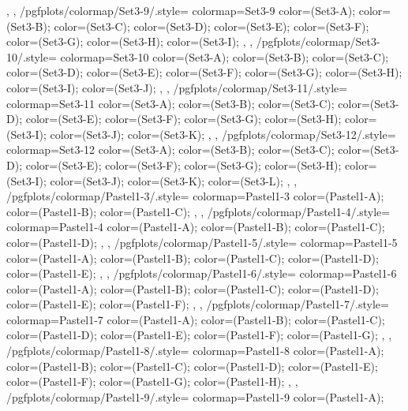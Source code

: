 {{{    },
  },
  /pgfplots/colormap/Set3-9/.style={
    colormap={Set3-9}{
      color=(Set3-A);
      color=(Set3-B);
      color=(Set3-C);
      color=(Set3-D);
      color=(Set3-E);
      color=(Set3-F);
      color=(Set3-G);
      color=(Set3-H);
      color=(Set3-I);
    },
  },
  /pgfplots/colormap/Set3-10/.style={
    colormap={Set3-10}{
      color=(Set3-A);
      color=(Set3-B);
      color=(Set3-C);
      color=(Set3-D);
      color=(Set3-E);
      color=(Set3-F);
      color=(Set3-G);
      color=(Set3-H);
      color=(Set3-I);
      color=(Set3-J);
    },
  },
  /pgfplots/colormap/Set3-11/.style={
    colormap={Set3-11}{
      color=(Set3-A);
      color=(Set3-B);
      color=(Set3-C);
      color=(Set3-D);
      color=(Set3-E);
      color=(Set3-F);
      color=(Set3-G);
      color=(Set3-H);
      color=(Set3-I);
      color=(Set3-J);
      color=(Set3-K);
    },
  },
  /pgfplots/colormap/Set3-12/.style={
    colormap={Set3-12}{
      color=(Set3-A);
      color=(Set3-B);
      color=(Set3-C);
      color=(Set3-D);
      color=(Set3-E);
      color=(Set3-F);
      color=(Set3-G);
      color=(Set3-H);
      color=(Set3-I);
      color=(Set3-J);
      color=(Set3-K);
      color=(Set3-L);
    },
  },
  /pgfplots/colormap/Pastel1-3/.style={
    colormap={Pastel1-3}{
      color=(Pastel1-A);
      color=(Pastel1-B);
      color=(Pastel1-C);
    },
  },
  /pgfplots/colormap/Pastel1-4/.style={
    colormap={Pastel1-4}{
      color=(Pastel1-A);
      color=(Pastel1-B);
      color=(Pastel1-C);
      color=(Pastel1-D);
    },
  },
  /pgfplots/colormap/Pastel1-5/.style={
    colormap={Pastel1-5}{
      color=(Pastel1-A);
      color=(Pastel1-B);
      color=(Pastel1-C);
      color=(Pastel1-D);
      color=(Pastel1-E);
    },
  },
  /pgfplots/colormap/Pastel1-6/.style={
    colormap={Pastel1-6}{
      color=(Pastel1-A);
      color=(Pastel1-B);
      color=(Pastel1-C);
      color=(Pastel1-D);
      color=(Pastel1-E);
      color=(Pastel1-F);
    },
  },
  /pgfplots/colormap/Pastel1-7/.style={
    colormap={Pastel1-7}{
      color=(Pastel1-A);
      color=(Pastel1-B);
      color=(Pastel1-C);
      color=(Pastel1-D);
      color=(Pastel1-E);
      color=(Pastel1-F);
      color=(Pastel1-G);
    },
  },
  /pgfplots/colormap/Pastel1-8/.style={
    colormap={Pastel1-8}{
      color=(Pastel1-A);
      color=(Pastel1-B);
      color=(Pastel1-C);
      color=(Pastel1-D);
      color=(Pastel1-E);
      color=(Pastel1-F);
      color=(Pastel1-G);
      color=(Pastel1-H);
    },
  },
  /pgfplots/colormap/Pastel1-9/.style={
    colormap={Pastel1-9}{
      color=(Pastel1-A);
}}}
